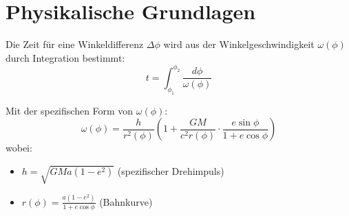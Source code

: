 \section{Physikalische Grundlagen}
Die Zeit für eine Winkeldifferenz $\Delta\phi$ wird aus der Winkelgeschwindigkeit $\omega(\phi)$ durch Integration bestimmt:
\[
t = \int_{\phi_1}^{\phi_2} \frac{d\phi}{\omega(\phi)}
\]

Mit der spezifischen Form von $\omega(\phi)$:
\[
\omega(\phi) = \frac{h}{r^2(\phi)} \left(1 + \frac{GM}{c^2 r(\phi)} \cdot \frac{e \sin \phi}{1 + e \cos \phi}\right)
\]
wobei:
\begin{itemize}
\item $h = \sqrt{GMa(1-e^2)}$ (spezifischer Drehimpuls)
\item $r(\phi) = \frac{a(1-e^2)}{1 + e \cos \phi}$ (Bahnkurve)
\end{itemize}